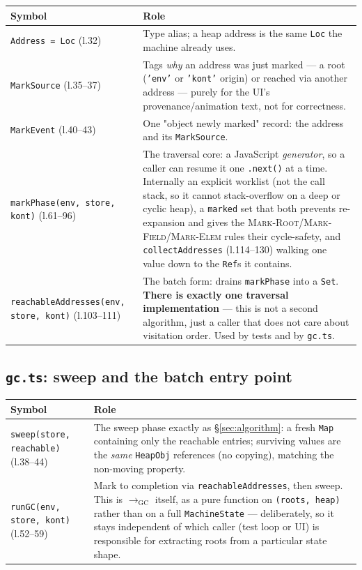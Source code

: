 \documentclass[11pt]{article}
\newcommand{\rulename}[1]{\textsc{#1}}
\begin{document}
\begin{center}
\begin{tabular}{@{}p{4.2cm}p{11cm}@{}}
\toprule
\textbf{Symbol} & \textbf{Role} \\
\midrule
\texttt{Address = Loc} (l.32) & Type alias; a heap address is the same
  \texttt{Loc} the machine already uses. \\
\texttt{MarkSource} (l.35--37) & Tags \emph{why} an address was just marked
  --- a root (\texttt{'env'} or \texttt{'kont'} origin) or reached via
  another address --- purely for the UI's provenance/animation text, not
  for correctness. \\
\texttt{MarkEvent} (l.40--43) & One "object newly marked" record: the
  address and its \texttt{MarkSource}. \\
\texttt{markPhase(env, store, kont)} (l.61--96) & The traversal core: a
  JavaScript \emph{generator}, so a caller can resume it one
  \texttt{.next()} at a time. Internally an explicit worklist (not the call
  stack, so it cannot stack-overflow on a deep or cyclic heap), a
  \texttt{marked} set that both prevents re-expansion and gives the
  \rulename{Mark-Root}/\rulename{Mark-Field}/\rulename{Mark-Elem} rules
  their cycle-safety, and \texttt{collectAddresses} (l.114--130) walking one
  value down to the \texttt{Ref}s it contains. \\
\texttt{reachableAddresses(env, store, kont)} (l.103--111) & The batch
  form: drains \texttt{markPhase} into a \texttt{Set}. \textbf{There is
  exactly one traversal implementation} --- this is not a second algorithm,
  just a caller that does not care about visitation order. Used by tests
  and by \texttt{gc.ts}. \\
\bottomrule
\end{tabular}
\end{center}

\subsection{\texttt{gc.ts}: sweep and the batch entry point}

\begin{center}
\begin{tabular}{@{}p{4.2cm}p{11cm}@{}}
\toprule
\textbf{Symbol} & \textbf{Role} \\
\midrule
\texttt{sweep(store, reachable)} (l.38--44) & The sweep phase exactly as
  \S\ref{sec:algorithm}: a fresh \texttt{Map} containing only the reachable
  entries; surviving values are the \emph{same} \texttt{HeapObj} references
  (no copying), matching the non-moving property. \\
\texttt{runGC(env, store, kont)} (l.52--59) & Mark to completion via
  \texttt{reachableAddresses}, then sweep. This is $\longrightarrow_{\mathrm{GC}}$
  itself, as a pure function on \texttt{(roots, heap)} rather than on a
  full \texttt{MachineState} --- deliberately, so it stays independent of
  which caller (test loop or UI) is responsible for extracting roots from a
  particular state shape. \\
\bottomrule
\end{tabular}
\end{center}
\end{document}
